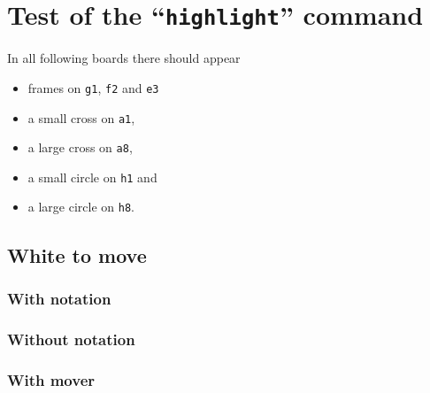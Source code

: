 \documentclass[a4paper, twocolumn]{article}
\def\square#1{\texttt{#1}}
\begin{document}
\section{Test of the ``\texttt{highlight}'' command}

In all following boards there should appear

\begin{itemize}
\item frames on \square{g1}, \square{f2} and \square{e3}
\item a small cross on \square{a1},
\item a large cross on \square{a8},
\item a small circle on \square{h1} and
\item a large circle on \square{h8}.
\end{itemize}

\subsection{White to move}
\subsubsection{With notation}

\centerline{\showboard}

\medskip
\centerline{\showinverseboard}

\subsubsection{Without notation}
\notationOff

\centerline{\showboard}

\medskip
\centerline{\showinverseboard}

\subsubsection{With mover}
\showmoverOn
\notationOn

\centerline{\showboard}
\end{document}
